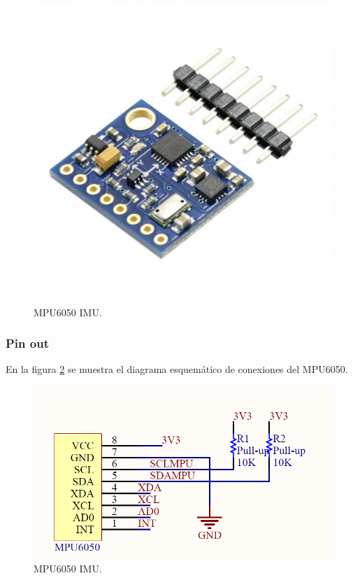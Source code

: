 \begin{figure}[H]
	\center
	\includegraphics[scale=0.2]{imagenes/Balancing_robot/IMU1}
	\caption{MPU6050 IMU.}
	\label{fig:IMU1}
\end{figure}
\subsubsection{Pin out}

En la figura \ref{fig:MPU6050_schematic} se muestra el diagrama esquemático de conexiones del MPU6050.

\begin{figure}[H]
	\center
	\includegraphics[scale=0.4]{imagenes/Balancing_robot/MPU6050_schematic}
	\caption{MPU6050 IMU.}
	\label{fig:MPU6050_schematic}
\end{figure}


